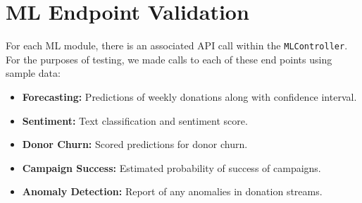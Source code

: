 \documentclass{thesis-library}
\begin{document}
\section{ML Endpoint Validation}
For each ML module, there is an associated API call within the \texttt{MLController}. For the purposes of testing, we made calls to each of these end points using sample data:
\begin{itemize}
    \item \textbf{Forecasting:} Predictions of weekly donations along with confidence interval.
    \item \textbf{Sentiment:} Text classification and sentiment score.
    \item \textbf{Donor Churn:} Scored predictions for donor churn.
    \item \textbf{Campaign Success:} Estimated probability of success of campaigns.
    \item \textbf{Anomaly Detection:} Report of any anomalies in donation streams.
\end{itemize}
\end{document}
